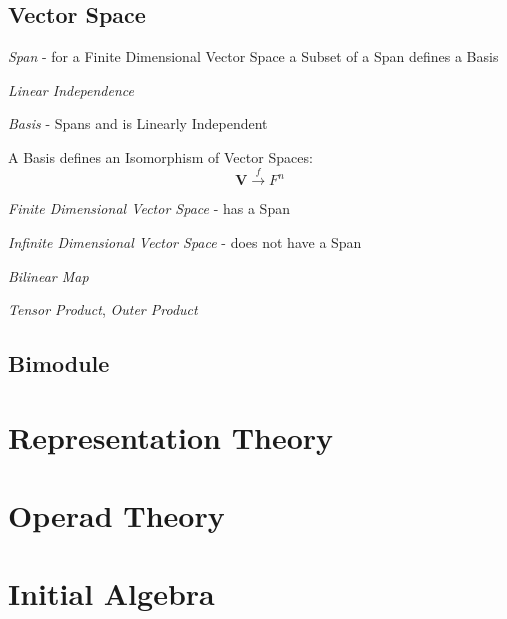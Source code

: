 \subsection{Vector Space}\label{subsec:vector_space}

\emph{Span} - for a Finite Dimensional Vector Space a Subset of a Span
defines a Basis

\emph{Linear Independence}

\emph{Basis} - Spans and is Linearly Independent

A Basis defines an Isomorphism of Vector Spaces:
\[
    \mathbf{V} \xrightarrow{f} F^n
\]

\emph{Finite Dimensional Vector Space} - has a Span

\emph{Infinite Dimensional Vector Space} - does not have a Span

\emph{Bilinear Map}

\emph{Tensor Product}, \emph{Outer Product}




\subsection{Bimodule}\label{subsec:bimodule}



\section{Representation Theory}

\section{Operad Theory}\label{subsec:operad_theory}

\section{Initial Algebra}\label{subsec:initial_algebra}

